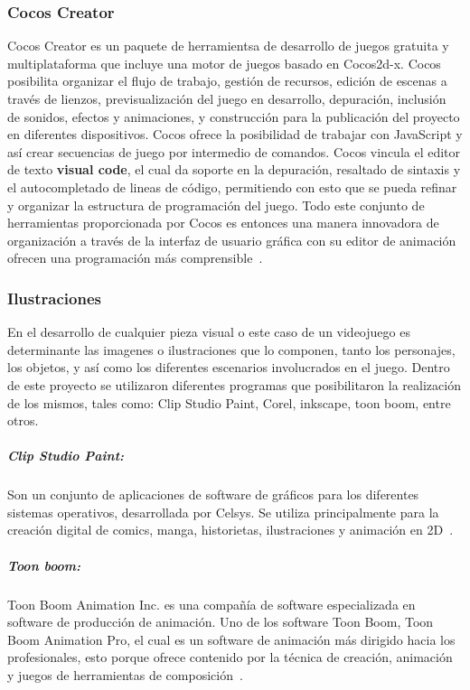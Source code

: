\documentclass[a4paper]{article}
\begin{document}
\subsubsection{Cocos Creator}
Cocos Creator es un paquete de herramientsa de desarrollo de juegos gratuita y multiplataforma que incluye una motor de juegos basado en Cocos2d-x. Cocos posibilita organizar el flujo de trabajo, gestión de recursos, edición de escenas a través de lienzos, previsualización del juego en desarrollo, depuración, inclusión de sonidos, efectos y animaciones, y construcción para la publicación del proyecto en diferentes dispositivos. Cocos ofrece la posibilidad de trabajar con JavaScript y así crear secuencias de juego por intermedio de comandos. Cocos vincula el editor de texto \textbf{visual code}, el cual da soporte en la depuración, resaltado de sintaxis y el autocompletado de lineas de código, permitiendo con esto que se pueda refinar y organizar la estructura de programación del juego. Todo este conjunto de herramientas proporcionada por Cocos es entonces una manera innovadora de organización a través de la interfaz de usuario gráfica con su editor de animación ofrecen una programación más comprensible~\citep{Cocos}.

\subsubsection{Ilustraciones}
En el desarrollo de cualquier pieza visual o este caso de un videojuego es determinante las imagenes o ilustraciones que lo componen, tanto los personajes, los objetos, y así como los diferentes escenarios involucrados en el juego. Dentro de este proyecto se utilizaron diferentes programas que posibilitaron la realización de los mismos, tales como: Clip Studio Paint, Corel, inkscape, toon boom, entre otros.

\subparagraph*{Clip Studio Paint:} Son un conjunto de aplicaciones de software de gráficos para los diferentes sistemas operativos, desarrollada por Celsys. Se utiliza principalmente para la creación digital de comics, manga, historietas, ilustraciones y animación en 2D~\citep{ClipP}.

\subparagraph*{Toon boom:} Toon Boom Animation Inc. es una compañía de software especializada en software de producción de animación. Uno de los software Toon Boom, Toon Boom Animation Pro, el cual  es un software de animación más dirigido hacia los profesionales, esto porque ofrece contenido por la técnica de creación, animación y juegos de herramientas de composición~\citep{ToonB}. 
\end{document}
